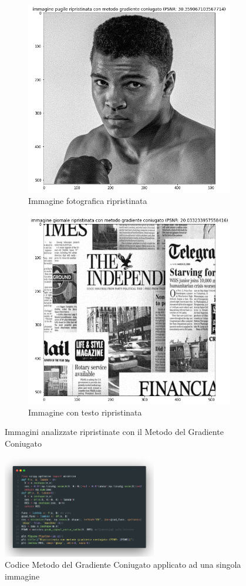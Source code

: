 \begin{figure}[H]
  \begin{subfigure}{0.5\textwidth}
    \centering
    \includegraphics[width=0.6\linewidth]{imgRel/pugilemgc.png}
    \caption{Immagine fotografica ripristinata}
  \end{subfigure}\hfill
  \begin{subfigure}{0.5\textwidth}
    \centering
    \includegraphics[width=0.6\linewidth]{imgRel/giornalemgc.png}
    \caption{Immagine con testo ripristinata}
  \end{subfigure}
  \caption{Immagini analizzate ripristinate con il Metodo del Gradiente Coniugato}

  \centering
    \includegraphics[width=0.6\textwidth]{imgCode/metGradCon.png}
    \caption{Codice Metodo del Gradiente Coniugato applicato ad una singola immagine}
    \label{fig:codeMGC}
\end{figure}

